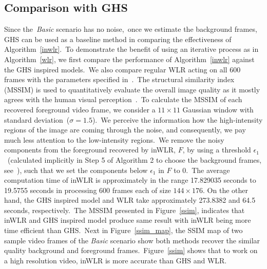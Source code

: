\documentclass[10pt,twocolumn,letterpaper]{article}
\begin{document}
\subsection{Comparison with GHS}\label{3-1}
\vspace{-0.0in}
Since the~{\it Basic} scenario has no noise,~once we estimate the background frames, GHS can be used as a baseline method in comparing the effectiveness of Algorithm~\ref{inwlr}.~To demonstrate the benefit of using an iterative process as in Algorithm~\ref{wlr}, we first compare the performance of Algorithm~\ref{inwlr} against the GHS inspired models.~We also compare regular WLR acting on all 600 frames with the parameters specified in~\cite{duttali_bg}.~The structural similarity index (MSSIM) is used to quantitatively evaluate the overall image quality as it mostly agrees with the human visual perception~\cite{mssim}.~To calculate the MSSIM of each recovered foreground video frame, we consider a $11\times 11$ Gaussian window with standard deviation~($\sigma= 1.5$).~We perceive the information how the high-intensity regions of the image are coming through the noise, and consequently, we pay much less attention to the low-intensity regions.~We remove the noisy components from the foreground recovered by inWLR, $F$, by using a threshold $\epsilon_1$~(calculated implicitly in Step 5 of Algorithm 2 to choose the background frames, see~\cite{duttaligongshah}), such that we set the components below $\epsilon_1$ in $F$ to 0.~The average computation time of inWLR is approximately in the range 17.829035 seconds to 19.5755 seconds in processing 600 frames each of size $144\times 176$. On the other hand, the GHS inspired model and WLR take approximately 273.8382 and 64.5 seconds, respectively.~The MSSIM presented in Figure~\ref{ssim}, indicates that inWLR and GHS inspired model produce same result with inWLR being more time efficient than GHS.~Next in Figure~\ref{ssim_map}, the SSIM map of two sample video frames of the {\it Basic} scenario show both methods recover the similar quality background and foreground frames.~Figure~\ref{ssim} shows that to work on a high resolution video, inWLR is more accurate than GHS and WLR.
\vspace{-0.0in}
\end{document}
